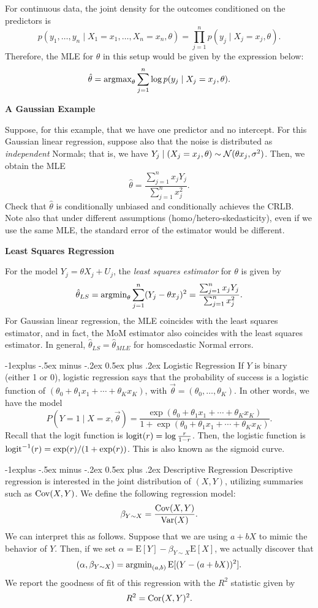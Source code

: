\documentclass[10pt,landscape]{article}
\makeatletter
\renewcommand{\subsection}{\@startsection{subsection}{2}{0mm}%
                                {-1explus -.5ex minus -.2ex}%
                                {0.5ex plus .2ex}%
                                {\normalfont\normalsize\bfseries}}
\newcommand{\E}{\text{E}}
\makeatother
\begin{document}
\begin{multicols*}{3}
For continuous data, the joint density for the outcomes conditioned on the predictors is $$p(y_1,\dots,y_n\mid X_1=x_1,\dots,X_n=x_n,\theta)=\prod_{j=1}^n p(y_j\mid X_j=x_j,\theta).$$ Therefore, the MLE for $\theta$ in this setup would be given by the expression below: $$\hat{\theta}=\operatorname{argmax}_\theta \sum_{j=1}^n \log p(y_j\mid X_j=x_j,\theta).$$

\textbf{A Gaussian Example}

Suppose, for this example, that we have one predictor and no intercept. For this Gaussian linear regression, suppose also that the noise is distributed as \emph{independent} Normals; that is, we have $Y_j\mid (X_j=x_j,\theta) \sim \mathcal{N}(\theta x_j,\sigma^2)$. Then, we obtain the MLE $$\hat{\theta}=\frac{\sum_{j=1}^n x_jY_j}{\sum_{j=1}^n x_j^2}.$$ Check that $\hat{\theta}$ is conditionally unbiased and conditionally achieves the CRLB. Note also that under different assumptions (homo/hetero-skedasticity), even if we use the same MLE, the standard error of the estimator would be different.

\textbf{Least Squares Regression}

For the model $Y_j=\theta X_j+U_j$, the \emph{least squares estimator} for $\theta$ is given by $$\hat{\theta}_{LS}=\operatorname{argmin}_\theta \sum_{j=1}^n (Y_j-\theta x_j)^2=\frac{\sum_{j=1}^n x_jY_j}{\sum_{j=1}^n x_j^2}.$$ For Gaussian linear regression, the MLE coincides with the least squares estimator, and in fact, the MoM estimator also coincides with the least squares estimator. In general, $\hat\theta_{LS}=\hat\theta_{MLE}$ for homscedastic Normal errors.

\subsection{Logistic Regression}
If $Y$ is binary (either 1 or 0), logistic regression says that the probability of success is a logistic function of $(\theta_0 + \theta_1 x_1 +\cdots + \theta_K x_K)$, with $\vec \theta= (\theta_0, \dots, \theta_K)$. In other words, we have the model $$P(Y=1\mid X=x,\vec \theta)=\frac{\exp(\theta_0 + \theta_1 x_1 +\cdots + \theta_K x_K)}{1+\exp(\theta_0 + \theta_1 x_1 +\cdots + \theta_K x_K)}.$$ Recall that the logit function is $\operatorname{logit}(r)=\log \frac{r}{1-r}$. Then, the logistic function is $\operatorname{logit}^{-1}(r)= \exp(r)/(1+\exp(r))$. This is also known as the sigmoid curve.

\subsection{Descriptive Regression}
Descriptive regression is interested
in the joint distribution of $(X,Y)$, utilizing summaries such as $\operatorname{Cov}(X, Y)$. We define the following regression model: $$\beta_{Y\sim X} =\frac{\operatorname{Cov}(X,Y)}{\operatorname{Var}( X)}.$$ We can interpret this as follows. Suppose that we are using $a + bX$ to mimic the behavior of $Y$. Then, if we set $\alpha = \E [Y] -\beta_{Y\sim X} \E [X]$, we actually discover that $$(\alpha,\beta_{Y\sim X})=\argmin_{(a,b)}\E [(Y-(a+bX))^2].$$ We report the goodness of fit of this regression with the $R^2$ statistic given by $$R^2=\operatorname{Cor}(X,Y)^2.$$


\end{multicols*}
\end{document}
